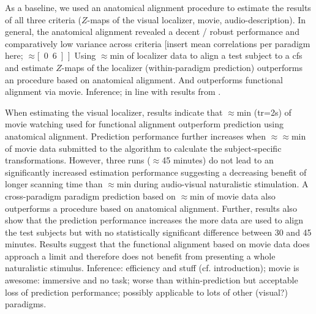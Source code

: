 



As a baseline, we used an anatomical alignment procedure to estimate the results
of all three criteria ($Z$-maps of the visual localizer, movie,
audio-description).
%
In general, the anatomical alignment revealed a decent / robust performance and
comparatively low variance across criteria [insert mean correlations per
paradigm here; $\approx$\unit[0.6.]].
%

Using $\approx$\unit[15]{min} of localizer data to align a test subject to a
\ac{cfs} and estimate $Z$-maps of the localizer (within-paradigm prediction)
outperforms an procedure based on anatomical alignment.
%
And outperforms functional alignment via movie.
%
Inference; in line with results from \citep{haxby2011common}.

%
When estimating the visual localizer, results indicate that
$\approx$\unit[15]{min} (\ac{tr}=2s) of movie watching used for
functional alignment outperform prediction using anatomical alignment.
%
Prediction performance further increases when
$\approx$$\approx$\unit[30]{min} of movie data submitted to the algorithm to
calculate the subject-specific transformations.
%
However, three runs ($\approx$45 minutes) do not lead to an significantly
increased estimation performance suggesting a decreasing benefit of longer
scanning time than $\approx$\unit[30]{min} during audio-visual naturalistic
stimulation.
%
A cross-paradigm paradigm prediction based on $\approx$\unit[15]{min}
of movie data also outperforms a procedure based on anatomical alignment.
%
Further, results also show that the prediction performance increases the more
data are used to align the test subjects but with no statistically significant
difference between 30 and 45 minutes.
%
Results suggest that the functional alignment based on movie data does approach
a limit and therefore does not benefit from presenting a whole naturalistic
stimulus.
%
Inference: efficiency and stuff (cf. introduction); movie is awesome: immersive
and no task; worse than within-prediction but acceptable
loss of prediction performance; possibly applicable to lots of other (visual?)
paradigms.

